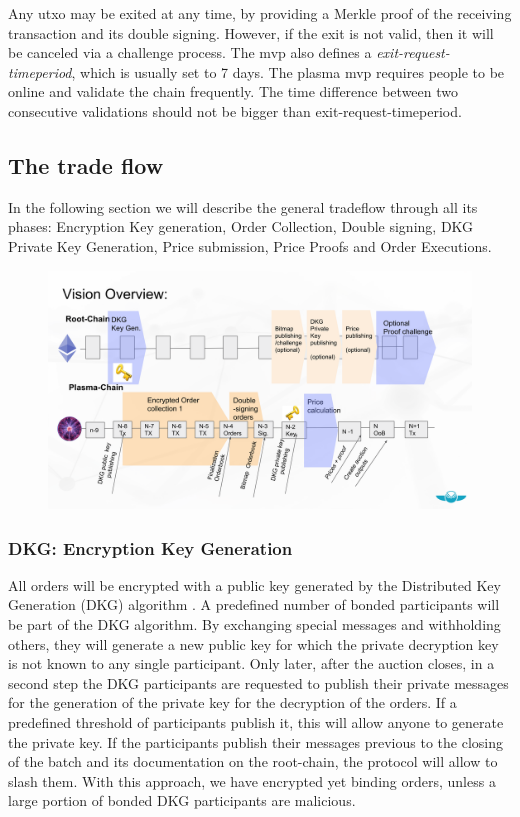 \documentclass[11pt,parskip=full]{scrartcl}%
\begin{document}
Any utxo may be exited at any time, by providing a Merkle proof of the receiving transaction and its double signing. 
However, if the exit is not valid, then it will be canceled via a challenge process.
The mvp also defines a \emph{exit-request-timeperiod}\label{exit-time}, which is usually set to 7 days. The plasma mvp requires people to be online and validate the chain frequently.
The time difference between two consecutive validations should not be bigger than exit-request-timeperiod.


\subsection{The trade flow}
\label{subsec:data}

In the following section we will describe the general tradeflow through all its phases: Encryption Key generation, Order Collection, Double signing, DKG Private Key Generation, Price submission, Price Proofs and Order Executions.

\begin{figure}
\centering
\includegraphics[width=\textwidth]{overview_tradeflow.png}
\end{figure}



\subsubsection{DKG: Encryption Key Generation}
All orders will be encrypted with a public key generated by the Distributed Key Generation (DKG) algorithm \cite{DKG}. 
A predefined number of bonded participants will be part of the DKG algorithm. 
By exchanging special messages and withholding others, they will generate a new public key for which the private decryption key is not known to any single participant. 
Only later, after the auction closes, in a second step the DKG participants are requested to publish their private messages for the generation of the private key for the decryption of the orders.
If a predefined threshold of participants publish it, this will allow anyone to generate the private key. 
If the participants publish their messages previous to the closing of the batch and its documentation on the root-chain, the protocol will allow to slash them. 
With this approach, we have encrypted yet binding orders, unless a large portion of bonded DKG participants are malicious. 
\end{document}
